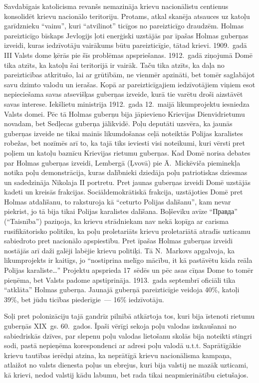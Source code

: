 \documentclass[twoside,a5paper,12pt,fleqn,openany]{extbook}
\newcommand{\rutxti}[1]{\textrussian{#1}}
\begin{document}
Savdabīgais katolicisma revanšs nemazināja krievu nacionālistu centienus konsolidēt krievu nacionālo teritoriju. Protams, atkal skanēja atsauces uz katoļu garīdznieku ``vainu'', kuri ``atvilinot'' ticīgos no pareizticīgo draudzēm. Holmas pareizticīgo bīskaps Jevlogijs ļoti enerģiski uzstājās par īpašas Holmas guberņas izveidi, kuras iedzīvotāju vairākums būtu pareizticīgie, tātad krievi. 1909.~gadā III Valsts dome ķērās pie šīs problēmas apspriešanas. 1912.~gadā ziņojumā Domē tika atzīts, ka katoļu šai teritorijā ir vairāk. Taču tika atzīts, ka daļa no pareizticības atkritušo, lai ar grūtībām, ne vienmēr apzināti, bet tomēr saglabājot savu dzimto valodu un ierašas. Kopā ar pareizticīgajiem iedzīvotājiem viņiem esot nepieciešama savas atsevišķas guberņas izveide, kurā tie varētu droši aizstāvēt savas interese. Iekšlietu ministrija 1912.~gada 12.~maijā likumprojektu iesniedza Valsts domei. Pēc tā Holmas guberņu bija jāpievieno Krievijas Dienvidrietumu novadam, bet Sedļecas guberņa jālikvidē. Poļu deputāti uzsvēra, ka jaunās guberņas izveide ne tikai mainīs likumdošanas ceļā noteiktās Polijas karalistes robežas, bet nozīmēs arī to, ka tajā tiks ieviesti visi noteikumi, kuri vērsti pret poļiem un katoļu baznīcu Krievijas rietumu guberņas. Kad Domē norisa debates par Holmas guberņas izveidi, Lembergā (Ļvovā) pie Ā.~Mickēviča pieminekļa notika poļu demonstrācija, kuras dalībnieki dziedāja poļu patriotiskas dziesmas un sadedzināja Nikolaja II portretu. Pret jaunas guberņas izveidi Domē uzstājās kadeti un kreisās frakcijas. Sociāldemokrātiskā frakcija, uzstājoties Domē pret Holmas atdalīšanu, to raksturoja kā ``ceturto Polijas dalīšanu'', kam nevar piekrist, jo tā bija tikai Polijas karalistes dalīšana. Boļševiku avīze ``\rutxti{Правда}'' (``Taisnība'') paziņoja, ka krievu strādniekam nav nekā kopīga ar carisma rusifikātorisko politiku, ka poļu proletariāts krievu proletariātā atradīs uzticamu sabiedroto pret nacionālo apspiestību. Pret īpašas Holmas guberņas izveidi nostājās arī daži galēji labējie krievu politiķi. Tā N.~Markovs apgalvoja, ka likumprojekts ir kaitīgs, jo ``nostiprina melīgo mācību, it kā pastāvētu kāda reāla Polijas karaliste\ldots{}'' Projektu apsprieda 17~sēdēs un pēc asas cīņas Dome to tomēr pieņēma, bet Valsts padome apstiprināja. 1913.~gada septembrī oficiāli tika ``atklāta'' Holmas guberņa. Jaunajā guberņā pareizticīgie veidoja 40\%, katoļi 39\%, bet jūdu ticības piederīgie~--- 16\% iedzīvotāju.

Soļi pret polonizāciju tajā gandrīz pilnībā atkārtoja tos, kuri bija īstenoti rietumu guberņās XIX~gs. 60.~gados. Īpaši vērīgi sekoja poļu valodas izskaušanai no sabiedriskās dzīves, par slepenu poļu valodas lietošanu skolās bija noteikti stingri sodi, pastā nepieņēma korespondenci ar adresi poļu valodā u.t.t. Saprātīgākie krievu tautības ierēdņi atzina, ka neprātīgā krievu nacionālisma kampaņa, atlaižot no valsts dienesta poļus un ebrejus, kuri bija valstij ne mazāk uzticami, kā krievi, nedod valstij kādu labumu, bet rada tikai neapmierinātību cietušajos.
\end{document}
